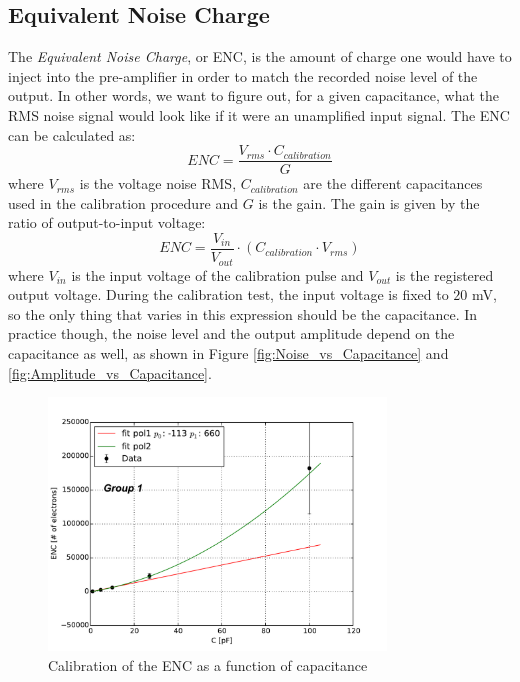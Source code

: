 \documentclass[12pt]{article}
\begin{document}
\subsection{Equivalent Noise Charge}

The \textit{Equivalent Noise Charge}, or ENC, is the amount of charge one would have to inject into the pre-amplifier in order to match the recorded noise level of the output. In other words, we want to figure out, for a given capacitance, what the RMS noise signal would look like if it were an unamplified input signal. The ENC can be calculated as:
\begin{equation}
ENC = \frac{V_{rms}\cdot C_{calibration}}{G}
\end{equation}
where $V_{rms}$ is the voltage noise RMS, $C_{calibration}$ are the different capacitances used in the calibration procedure and $G$ is the gain.
The gain is given by the ratio of output-to-input voltage:
\begin{equation}
ENC = \frac{V_{in}}{V_{out}}\cdot\left(C_{calibration}\cdot V_{rms}\right)
\end{equation}
where $V_{in}$ is the input voltage of the calibration pulse and $V_{out}$ is the registered output voltage.
During the calibration test, the input voltage is fixed to $20$ mV, so the only thing that varies in this expression should be the capacitance. In practice though, the noise level and the output amplitude depend on the capacitance as well, as shown in Figure \ref{fig:Noise_vs_Capacitance} and \ref{fig:Amplitude_vs_Capacitance}.

\begin{figure}[htb]
  \centering
  \includegraphics[width=0.8\textwidth]{./graphics/calibrationENC_diode}
  \caption{Calibration of the ENC as a function of capacitance} %
  \label{fig:ENC_vs_Capacitance}
\end{figure}
\end{document}
